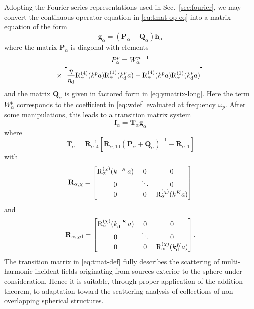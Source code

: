 \documentclass[article]{IEEEtran}
\newcommand{\M}[1]{\mathbf{#1}}
\newcommand{\T}[1]{\mathrm{#1}}
\newcommand{\rbkind}{\chi}
\newcommand{\Xopchar}{P}
\newcommand{\Yopchar}{Q}
\newcommand{\Xmat}{\mathbf{\Xopchar}}
\newcommand{\Ymat}{\mathbf{\Yopchar}}
\begin{document}
Adopting the Fourier series representations used in Sec.~\ref{sec:fourier}, we may convert the continuous operator equation in \eqref{eq:tmat-op-eq} into a matrix equation of the form
\begin{equation}
    \M{g}_\alpha = \left(\Xmat_\alpha + \Ymat_\alpha\right)\M{h}_\alpha
    \label{eq:tmat-mat-eq}
\end{equation}
where the matrix $\Xmat_\alpha$ is diagonal with elements
\begin{multline}
    \Xopchar_\alpha^{p} = W^{p,-1}_\alpha\\
    \times\left[\frac{\eta}{\eta_\T{d}}\Ra^{(4)}(k^pa)\Rb^{(1)}(k^p_\T{d}a) - \Rb^{(4)}(k^pa)\Ra^{(1)}(k^p_\T{d}a)\right]
\end{multline}
and the matrix $\Ymat_\alpha$ is given in factored form in \eqref{eq:ymatrix-long}.  Here the term $W^{p}_\alpha$ corresponds to the coefficient in \eqref{eq:wdef} evaluated at frequency $\omega_p$.  %
After some manipulations, this leads to a transition matrix system
\begin{equation}
    \M{f}_\alpha = \M{T}_\alpha\M{g}_\alpha
    \label{eq:tmat-def}
\end{equation}
where
\begin{equation}
    \M{T}_\alpha = \M{R}_{\alpha,4}^{-1}\left[\M{R}_{\alpha,1\T{d}}\left(\Xmat_\alpha+\Ymat_\alpha\right)^{-1}-\M{R}_{\alpha,1}\right]
    \label{eq:t-mat-final}
\end{equation}
with
\begin{equation}
    \M{R}_{\alpha,\rbkind} = \begin{bmatrix}
    \Ra^{(\rbkind)}(k^{-K}a) & 0 & 0 \\
    0  & \ddots & 0\\
    0  & 0 & \Ra^{(\rbkind)}(k^{K}a)
    \end{bmatrix}
    \label{eq:rp-mat}
\end{equation}
and    
\begin{equation}
    \M{R}_{\alpha,\rbkind\T{d}} = \begin{bmatrix}
    \Ra^{(\rbkind)}(k_\T{d}^{-K}a) & 0 & 0 \\
    0  & \ddots & 0\\
    0  & 0 & \Ra^{(\rbkind)}(k_\T{d}^{K}a)
    \end{bmatrix}.
    \label{eq:rpd-mat}
\end{equation}
The transition matrix in \eqref{eq:tmat-def} fully describes the scattering of multi-harmonic incident fields originating from sources exterior to the sphere under consideration.  Hence it is suitable, through proper application of the addition theorem, to adaptation toward the scattering analysis of collections of non-overlapping spherical structures. 
\end{document}
